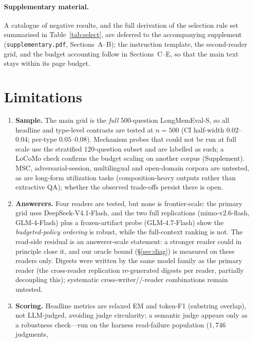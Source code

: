 \documentclass{article} %
\begin{document}
\paragraph{Supplementary material.} A catalogue of negative results, and the full derivation
of the selection rule set summarised in Table~\ref{tab:select}, are deferred to the
accompanying supplement (\texttt{supplementary.pdf}, Sections~A--B); the instruction
template, the second-reader grid, and the budget accounting follow in Sections~C--E, so that
the main text stays within its page budget.

\section{Limitations}
\label{sec:limits}
\begin{enumerate}\setlength{\itemsep}{1pt}
\item \textbf{Sample.} The main grid is the \emph{full} $500$-question LongMemEval-S, so all
headline and type-level contrasts are tested at $n{=}500$ (CI half-width $0.02$--$0.04$;
per-type $0.05$--$0.08$). Mechanism probes that could not be run at full scale use the
stratified $120$-question subset and are labelled as such; a LoCoMo check confirms the budget
scaling on another corpus (Supplement). MSC, adversarial-session, multilingual and
open-domain corpora are untested, as are long-form utilization tasks (composition-heavy
outputs rather than extractive QA); whether the observed trade-offs persist there is open.
\item \textbf{Answerers.} Four readers are tested, but none is frontier-scale: the primary
grid uses DeepSeek-V4.1-Flash, and the two full replications (mimo-v2.6-flash, GLM-4-Flash)
plus a frozen-artifact probe (GLM-4.7-Flash) show the \emph{budgeted-policy ordering} is
robust, while the full-context ranking is not. The read-side residual is an answerer-scale
statement: a stronger reader could in principle close it, and our oracle bound
(\S\ref{sec:diag}) is measured on these readers only. Digests were written by the
same model family as the primary reader (the cross-reader replication re-generated digests
per reader, partially decoupling this); systematic cross-writer/\slash-reader
combinations remain untested.
\item \textbf{Scoring.} Headline metrics are relaxed EM and token-F1 (substring overlap),
not LLM-judged, avoiding judge circularity; a semantic judge appears only as a robustness
check---run on the harness read-failure population ($1{,}746$ judgments,

\end{enumerate}
\end{document}
